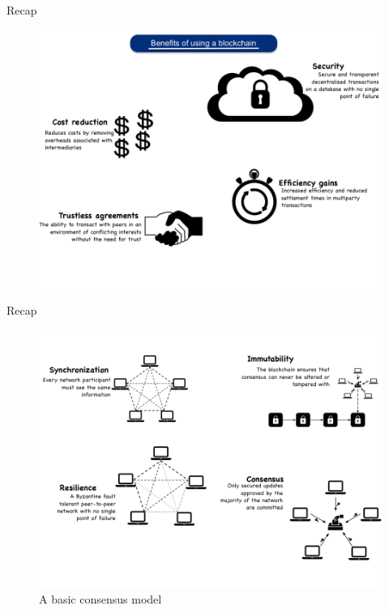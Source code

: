 \documentclass[10pt]{beamer}
\begin{document}

\begin{frame}{Recap}
	\begin{figure}[]
		\centering
		\includegraphics  [scale=0.3]{Images/benefits}
	\end{figure}
\end{frame}


\begin{frame}{Recap}
	\begin{figure}[]
		\centering
		\includegraphics  [scale=0.3]{Images/consensus}
		\caption{A basic consensus model}
	\end{figure}
\end{frame}
\end{document}
